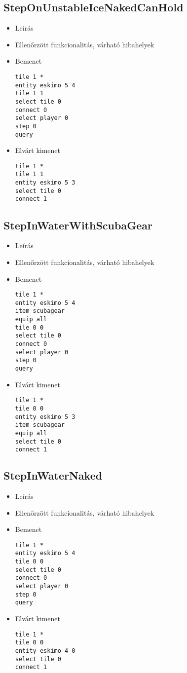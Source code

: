 \subsection{StepOnUnstableIceNakedCanHold}
\begin{itemize}
\item Leírás\newline
\item Ellenőrzött funkcionalitás, várható hibahelyek
\item Bemenet
\begin{lstlisting}
tile 1 *
entity eskimo 5 4
tile 1 1
select tile 0
connect 0
select player 0
step 0
query
\end{lstlisting}
\item Elvárt kimenet
\begin{lstlisting}
tile 1 *
tile 1 1
entity eskimo 5 3
select tile 0
connect 1
\end{lstlisting}
\end{itemize}

\subsection{StepInWaterWithScubaGear}
\begin{itemize}
\item Leírás\newline
\item Ellenőrzött funkcionalitás, várható hibahelyek
\item Bemenet
\begin{lstlisting}
tile 1 *
entity eskimo 5 4
item scubagear
equip all
tile 0 0
select tile 0
connect 0
select player 0
step 0
query
\end{lstlisting}
\item Elvárt kimenet
\begin{lstlisting}
tile 1 *
tile 0 0
entity eskimo 5 3
item scubagear
equip all
select tile 0
connect 1
\end{lstlisting}
\end{itemize}

\subsection{StepInWaterNaked}
\begin{itemize}
\item Leírás\newline
\item Ellenőrzött funkcionalitás, várható hibahelyek
\item Bemenet
\begin{lstlisting}
tile 1 *
entity eskimo 5 4
tile 0 0
select tile 0
connect 0
select player 0
step 0
query
\end{lstlisting}
\item Elvárt kimenet
\begin{lstlisting}
tile 1 *
tile 0 0
entity eskimo 4 0
select tile 0
connect 1
\end{lstlisting}
\end{itemize}

